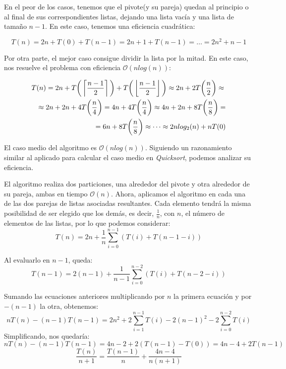\documentclass[a4paper, 11pt]{article} %
\begin{document}
      En el peor de los casos, tenemos que el pivote(y su pareja) quedan al principio o al final de sus correspondientes listas, dejando una lista vacía y una lista de tamaño $n-1$. En este caso, tenemos una eficiencia cuadrática:
      
	  \begin{equation}
	  	T(n) = 2n + T(0) + T(n-1) = 2n + 1 + T(n-1) = \dots = 2n^2 + n - 1
	  \end{equation}
      
      Por otra parte, el mejor caso consigue dividir la lista por la mitad. En este caso, nos resuelve el problema con eficiencia $\mathcal{O}(nlog(n))$:
      
	  \begin{eqnarray*}
	  \lefteqn{T(n) = 2n + T\bigg(\left\lceil \frac{n-1}{2} \right\rceil\bigg) + T\bigg(\left\lfloor \frac{n-1}{2}\right\rfloor\bigg) \approx 2n + 2T\bigg(\frac{n}{2}\bigg) \approx} \\
	  && \approx 2n + 2n + 4T\bigg(\frac{n}{4}\bigg) = 4n + 4T\bigg(\frac{n}{4}\bigg)\approx 4n + 2n + 8T\bigg(\frac{n}{8}\bigg) = \\ 
	  && = 6n + 8T\bigg(\frac{n}{8}\bigg) \approx \dots \approx 2nlog_2(n) + n T(0)
	  \end{eqnarray*}
	  
      El caso medio del algoritmo es $\mathcal{O}(nlog(n)) $. Siguiendo un razonamiento similar al aplicado para calcular el caso medio en \textit{Quicksort}, podemos analizar su eficiencia.
    
      El algoritmo realiza dos particiones, una alrededor del pivote y otra alrededor de su pareja, ambas en tiempo $\mathcal{O}(n)$. Ahora, aplicamos el algoritmo
      en cada una de las dos parejas de listas asociadas resultantes. Cada elemento tendrá la misma posibilidad de ser elegido que los demás, es decir, $\frac{1}{n}$,
      con $n$, el número de elementos de las listas, por lo que podemos considerar:
      \begin{equation}
		T(n) = 2n + \frac{1}{n}\sum_{i=0}^{n-1}\left(T(i) + T(n-1-i) \right)
      \end{equation}
      
      Al evaluarlo en $n-1$, queda:
      \begin{equation}
      	T(n-1) = 2(n-1) + \frac{1}{n-1}\sum_{i=0}^{n-2}\left(T(i) + T(n-2-i) \right)
      \end{equation}
      
      Sumando las ecuaciones anteriores multiplicando por $n$ la primera ecuación y por $-(n-1)$ la otra, obtenemos:
      \begin{equation}
        nT(n) - (n-1)T(n-1) = 2n^2 + 2\sum^{n-1}_{i=1} T(i) - 2(n-1)^2 - 2\sum_{i=0}^{n-2}T(i)
      \end{equation}
      Simplificando, nos quedaría:
	  \begin{equation}
	    nT(n) - (n-1)T(n-1) = 4n-2 + 2(T(n-1) - T(0)) = 4n - 4 + 2T(n-1) 
	  \end{equation}
	  \begin{equation}
	    \frac{T(n)}{n+1} = \frac{T(n-1)}{n} + \frac{4n-4}{n(n+1)}
	  \end{equation}
	  	  
\end{document}
